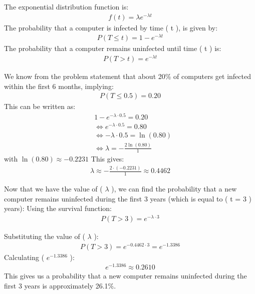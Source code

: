 \begin{solution}
The exponential distribution function is:
\begin{align*}
    f(t) = \lambda e^{-\lambda t}
\end{align*}
The probability that a computer is infected by time ( t ), is given by:
\begin{align*}
   P(T \leq t) = 1 - e^{-\lambda t} 
\end{align*}
The probability that a computer remains uninfected until time ( t ) is:
\begin{align*}
    P(T > t) = e^{-\lambda t}
\end{align*}

We know from the problem statement that about 20\% of computers get infected within the first 6 months, implying:
\begin{align*}
P(T \leq 0.5) = 0.20
\end{align*}
This can be written as:
\begin{align*}
    &1 - e^{-\lambda \cdot 0.5} = 0.20\\
    &\Longleftrightarrow 
    e^{-\lambda \cdot 0.5} = 0.80\\
    &\Longleftrightarrow  -\lambda \cdot 0.5  = \ln(0.80)
    \\ &\Longleftrightarrow \lambda = -\frac{2 \ln(0.80)}{1}
\end{align*}
with $\ln(0.80) \approx -0.2231$ 
This gives:
\begin{align*}
    \lambda \approx -\frac{2 \cdot (-0.2231)}{1} \approx 0.4462
\end{align*}

Now that we have the value of ( $\lambda$ ), we can find the probability that a new computer remains uninfected during the first 3 years (which is equal to ( t = 3 ) years):
Using the survival function:
\begin{align*}
    P(T > 3) = e^{-\lambda \cdot 3}
\end{align*}

Substituting the value of ( $\lambda$ ):
\begin{align*}
  P(T > 3) = e^{-0.4462 \cdot 3} = e^{-1.3386}  
\end{align*}
Calculating ( $e^{-1.3386}$ ):
\begin{align*}
    e^{-1.3386} \approx 0.2610
\end{align*}
This gives us a probability that a new computer remains uninfected during the first 3 years is approximately 26.1\%.
\end{solution}